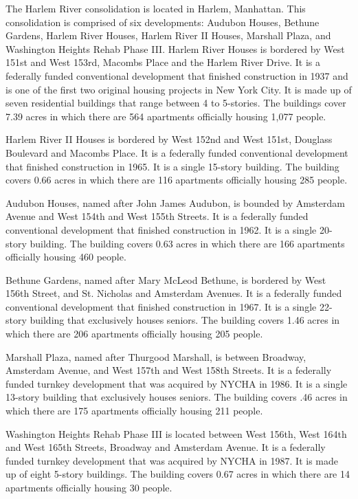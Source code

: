

 

The Harlem River consolidation is located in Harlem, Manhattan. This consolidation is comprised of six developments: Audubon Houses, Bethune Gardens, Harlem River Houses, Harlem River II Houses, Marshall Plaza, and Washington Heights Rehab Phase III. Harlem River Houses is bordered by West 151st and West 153rd, Macombs Place and the Harlem River Drive. It is a federally funded conventional development that finished construction in 1937 and is one of the first two original housing projects in New York City. It is made up of seven residential buildings that range between 4 to 5-stories. The buildings cover 7.39 acres in which there are 564 apartments officially housing 1,077 people. 

Harlem River II Houses is bordered by West 152nd and West 151st, Douglass Boulevard and Macombs Place. It is a federally funded conventional development that finished construction in 1965. It is a single 15-story building. The building covers 0.66 acres in which there are 116 apartments officially housing 285 people. 

Audubon Houses, named after John James Audubon, is bounded by Amsterdam Avenue and West 154th and West 155th Streets. It is a federally funded conventional development that finished construction in 1962. It is a single 20-story building. The building covers 0.63 acres in which there are 166 apartments officially housing 460 people. 

Bethune Gardens, named after Mary McLeod Bethune, is bordered by West 156th Street, and St. Nicholas and Amsterdam Avenues. It is a federally funded conventional development that finished construction in 1967. It is a single 22-story building that exclusively houses seniors. The building covers 1.46 acres in which there are 206 apartments officially housing 205 people.

Marshall Plaza, named after Thurgood Marshall, is between Broadway, Amsterdam Avenue, and West 157th and West 158th Streets. It is a federally funded turnkey development that was acquired by NYCHA in 1986. It is a single 13-story building that exclusively houses seniors. The building covers .46 acres in which there are 175 apartments officially housing 211 people.

Washington Heights Rehab Phase III is located between West 156th, West 164th and West 165th Streets, Broadway and Amsterdam Avenue. It is a federally funded turnkey development that was acquired by NYCHA in 1987. It is made up of eight 5-story buildings. The building covers 0.67 acres in which there are 14 apartments officially housing 30 people. 
